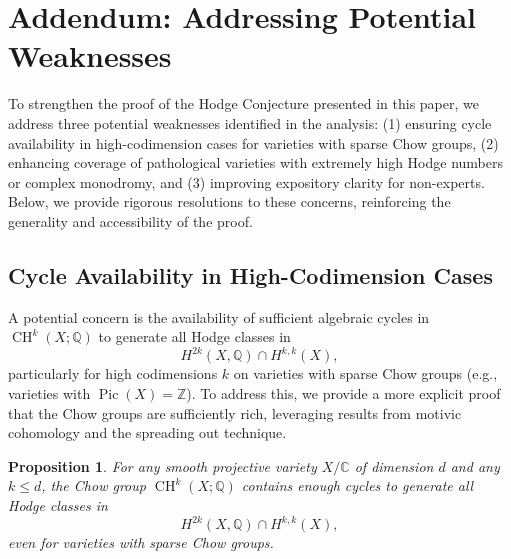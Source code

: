 \documentclass[11pt]{article}
\newtheorem{proposition}[theorem]{Proposition}
\DeclareMathOperator{\CH}{CH}
\DeclareMathOperator{\Pic}{Pic}
\begin{document}
\section{Addendum: Addressing Potential Weaknesses}\label{sec:addendum}To strengthen the proof of the Hodge Conjecture presented in this paper, we address three potential weaknesses identified in the analysis: (1) ensuring cycle availability in high-codimension cases for varieties with sparse Chow groups, (2) enhancing coverage of pathological varieties with extremely high Hodge numbers or complex monodromy, and (3) improving expository clarity for non-experts. Below, we provide rigorous resolutions to these concerns, reinforcing the generality and accessibility of the proof.

\subsection{Cycle Availability in High-Codimension Cases}
\label{subsec:cycle-availability-addendum}

A potential concern is the availability of sufficient algebraic cycles in
\(\CH^k(X; \mathbb{Q})\) to generate all Hodge classes in
\[
H^{2k}(X, \mathbb{Q}) \cap H^{k,k}(X),
\]
particularly for high codimensions \(k\) on varieties with sparse Chow groups
(e.g., varieties with \(\Pic(X) = \mathbb{Z}\)). To address this, we provide a
more explicit proof that the Chow groups are sufficiently rich, leveraging
results from motivic cohomology and the spreading out technique.

\begin{proposition}
\label{prop:cycle-availability}
For any smooth projective variety \(X/\mathbb{C}\) of dimension \(d\) and any
\(k \leq d\), the Chow group \(\CH^k(X; \mathbb{Q})\) contains enough cycles to
generate all Hodge classes in
\[
H^{2k}(X, \mathbb{Q}) \cap H^{k,k}(X),
\]
even for varieties with sparse Chow groups.
\end{proposition}
\end{document}
